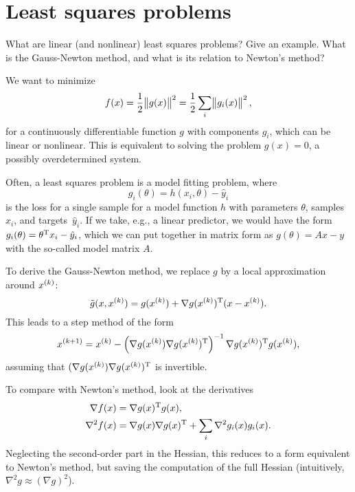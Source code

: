 \documentclass{article}
\begin{document}
\section{Least squares problems}

\begin{question}
  What are linear (and nonlinear) least squares problems?  Give an example.  What is the Gauss-Newton
  method, and what is its relation to Newton’s method?
\end{question}

We want to minimize
\begin{equation*}
  f(x) = \frac{1}{2} \enVert[1]{g(x)}^2 = \frac{1}{2} \sum_i \enVert[1]{g_i(x)}^2,
\end{equation*}
for a continuously differentiable function \(g\) with components \(g_i\), which can be linear or
nonlinear.  This is equivalent to solving the problem \(g(x) = 0\), a possibly overdetermined
system.

Often, a least squares problem is a model fitting problem, where
\begin{equation*}
  g_i(\theta) = h(x_i, \theta) - \hat{y}_i
\end{equation*}
is the loss for a single sample for a model function \(h\) with parameters \(\theta\), samples
\(x_i\), and targets~\(\hat{y}_i\).  If we take, e.g., a linear predictor, we would have the form
\(g_i(\theta) = \T{\theta} x_i - \hat{y}_i\), which we can put together in matrix form as
\(g(\theta) = Ax - y\) with the so-called model matrix \(A\).

To derive the Gauss-Newton method, we replace \(g\) by a local approximation around \(\kth{x}\):
\begin{equation*}
  \tilde{g}(x, \kth{x}) = g(\kth{x}) + \T{\nabla g(\kth{x})}(x - \kth{x}).
\end{equation*}
This leads to a step method of the form
\begin{equation*}
  \kth[k+1]{x} = \kth{x} - \left(\nabla g(\kth{x}) \T{\nabla g(\kth{x})}\right)^{-1} \T{\nabla g(\kth{x})} g(\kth{x}),
\end{equation*}
assuming that \((\nabla g(\kth{x}) \T{\nabla g(\kth{x})}\) is invertible.

To compare with Newton's method, look at the derivatives
\begin{align*}
  \nabla f(x) &= \T{\nabla g(x)} g(x), \\
  \nabla^2 f(x) &= \nabla g(x) \T{\nabla g(x)} + \sum_i \nabla^2 g_i(x) g_i(x).
\end{align*}
Neglecting the second-order part in the Hessian, this reduces to a form equivalent to Newton's
method, but saving the computation of the full Hessian (intuitively,
\(\nabla^2 g \approx (\nabla g)^2\)).
\end{document}
